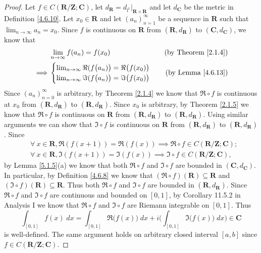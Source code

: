\begin{proof}
    Let \(f \in C(\mathbf{R} / \mathbf{Z} ; \mathbf{C})\), let \(d_{\mathbf{R}} = d_{l^1}|_{\mathbf{R} \times \mathbf{R}}\) and let \(d_{\mathbf{C}}\) be the metric in Definition \ref{4.6.10}.
    Let \(x_0 \in \mathbf{R}\) and let \((a_n)_{n = 1}^\infty\) be a sequence in \(\mathbf{R}\) such that \(\lim_{n \to \infty} a_n = x_0\).
    Since \(f\) is continuous on \(\mathbf{R}\) from \((\mathbf{R}, d_{\mathbf{R}})\) to \((\mathbf{C}, d_{\mathbf{C}})\), we know that
    \begin{align*}
                 & \lim_{n \to \infty} f(a_n) = f(x_0) & \text{(by Theorem \ref{2.1.4})} \\
        \implies & \begin{cases}
            \lim_{n \to \infty} \Re(f\big(a_n)\big) = \Re\big(f(x_0)\big) \\
            \lim_{n \to \infty} \Im(f\big(a_n)\big) = \Im\big(f(x_0)\big)
        \end{cases}           & \text{(by Lemma \ref{4.6.13})}
    \end{align*}
    Since \((a_n)_{n = 0}^\infty\) is arbitrary, by Theorem \ref{2.1.4} we know that \(\Re \circ f\) is continuous at \(x_0\) from \((\mathbf{R}, d_{\mathbf{R}})\) to \((\mathbf{R}, d_{\mathbf{R}})\).
    Since \(x_0\) is arbitrary, by Theorem \ref{2.1.5} we know that \(\Re \circ f\) is continuous on \(\mathbf{R}\) from \((\mathbf{R}, d_{\mathbf{R}})\) to \((\mathbf{R}, d_{\mathbf{R}})\).
    Using similar arguments we can show that \(\Im \circ f\) is continuous on \(\mathbf{R}\) from \((\mathbf{R}, d_{\mathbf{R}})\) to \((\mathbf{R}, d_{\mathbf{R}})\).
    Since
    \begin{align*}
         & \forall\ x \in \mathbf{R}, \Re(f(x + 1)) = \Re(f(x)) \implies \Re \circ f \in C(\mathbf{R} / \mathbf{Z} ; \mathbf{C}); \\
         & \forall\ x \in \mathbf{R}, \Im(f(x + 1)) = \Im(f(x)) \implies \Im \circ f \in C(\mathbf{R} / \mathbf{Z} ; \mathbf{C}),
    \end{align*}
    by Lemma \ref{5.1.5}(a) we know that both \(\Re \circ f\) and \(\Im \circ f\) are bounded in \((\mathbf{C}, d_{\mathbf{C}})\).
    In particular, by Definition \ref{4.6.8} we know that \((\Re \circ f)(\mathbf{R}) \subseteq \mathbf{R}\) and \((\Im \circ f)(\mathbf{R}) \subseteq \mathbf{R}\).
    Thus both \(\Re \circ f\) and \(\Im \circ f\) are bounded in \((\mathbf{R}, d_{\mathbf{R}})\).
    Since \(\Re \circ f\) and \(\Im \circ f\) are continuous and bounded on \([0, 1]\), by Corollary 11.5.2 in Analysis I we know that \(\Re \circ f\) and \(\Im \circ f\) are Riemann integrable on \([0, 1]\).
    Thus
    \[
        \int_{[0, 1]} f(x) \; dx = \int_{[0, 1]} \Re\big(f(x)\big) \; dx + i \bigg(\int_{[0, 1]} \Im\big(f(x)\big) \; dx\bigg) \in \mathbf{C}
    \]
    is well-defined.
    The same argument holds on arbitrary closed interval \([a, b]\) since \(f \in C(\mathbf{R} / \mathbf{Z} ; \mathbf{C})\).
\end{proof}

